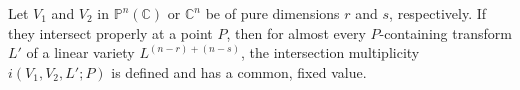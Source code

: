 Let $V_1$ and $V_2$ in $\mathbb{P}^n(\mathbb{C})$ or $\mathbb{C}^n$ be of pure dimensions $r$ and $s$, respectively. If they intersect properly at a point $P$, then for almost every $P$-containing transform $L'$ of a linear variety $L^{(n-r)+(n-s)}$, the intersection multiplicity $i(V_1, V_2, L'; P)$ is defined and has a common, fixed value.
